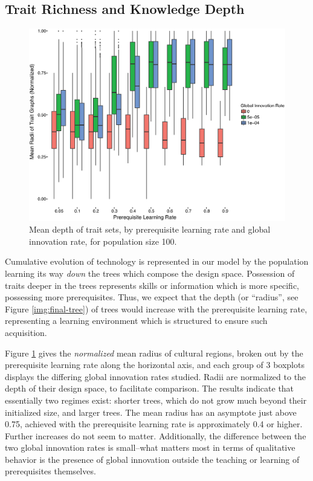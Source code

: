 \subsection{Trait Richness and Knowledge
Depth}\label{trait-richness-and-knowledge-depth}

\begin{figure}[htbp] 
\centering 
\includegraphics[scale=0.4]{graphics/semanticaxelrod/mean-radius-by-learning-rate-innov-12.eps} 
\caption{Mean depth of trait sets, by prerequisite learning rate and global innovation rate, for population size 100.} 
\label{img:mean-radius-cultures-100} 
\end{figure}

Cumulative evolution of technology is represented in our model by the
population learning its way \emph{down} the trees which compose the
design space. Possession of traits deeper in the trees represents skills
or information which is more specific, possessing more prerequisites.
Thus, we expect that the depth (or ``radius'', see Figure
\ref{img:final-tree}) of trees would increase with the prerequisite
learning rate, representing a learning environment which is structured
to ensure such acquisition.

Figure \ref{img:mean-radius-cultures-100} gives the \emph{normalized}
mean radius of cultural regions, broken out by the prerequisite learning
rate along the horizontal axis, and each group of 3 boxplots displays
the differing global innovation rates studied. Radii are normalized to
the depth of their design space, to facilitate comparison. The results
indicate that essentially two regimes exist: shorter trees, which do not
grow much beyond their initialized size, and larger trees. The mean
radius has an asymptote just above 0.75, achieved with the prerequisite
learning rate is approximately 0.4 or higher. Further increases do not
seem to matter. Additionally, the difference between the two global
innovation rates is small--what matters most in terms of qualitative
behavior is the presence of global innovation outside the teaching or
learning of prerequisites themselves.

